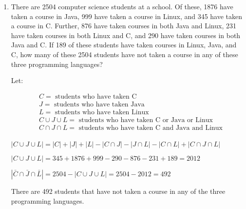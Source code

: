 \documentclass[12pt]{article}
\newenvironment{answer}{\larger[2]}{}
\begin{document}
\begin{enumerate}
\vfill



\item There are 2504 computer science students at a school. Of these, 1876 have taken a course in Java, 999 have taken a course in Linux, and 345 have taken a course in C. Further, 876 have taken courses in both Java and Linux, 231 have taken courses in both Linux and C, and 290 have taken courses in both Java and C. If 189 of these students have taken courses in Linux, Java, and C, how many of these 2504 students have not taken a course in any of these three programming languages?

\begin{answer}
    Let:

    \begin{align*}
        &C = \text{ students who have taken C} \\
        &J = \text{ students who have taken Java} \\
        &L = \text{ students who have taken Linux} \\
        &C \cup J \cup L = \text{ students who have taken C or Java or Linux} \\
        &C \cap J \cap L = \text{ students who have taken C and Java and Linux} \\
    \end{align*}

    $|C \cup J \cup L| = |C| + |J| + |L| - |C \cap J| - |J \cap L| - |C \cap L| + |C \cap J \cap L|$

    $|C \cup J \cup L| = 345 + 1876 + 999 - 290 - 876 - 231 + 189 = 2012$

    $|\bar{C} \cap \bar{J} \cap \bar{L}| = 2504 - |C \cup J \cup L| = 2504 - 2012 = 492$

    There are 492 students that have not taken a course in any of the three programming languages.
\end{answer}

\end{enumerate} %
\end{document}

